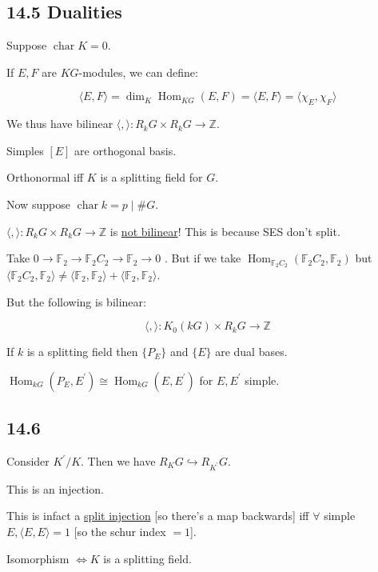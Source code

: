 \documentclass{article}
\theoremstyle{definition}
\begin{document}
\subsection*{14.5 Dualities}

Suppose \(\operatorname{char} K = 0\).

If \(E,F\) are \(KG\)-modules, we can define:

\[
    \langle E, F \rangle = \dim_K \operatorname{Hom}_{KG} (E,F) = \langle E,F \rangle = \langle \chi_E, \chi_F \rangle 
\]

We thus have bilinear \(\langle , \rangle : R_k G \times R_k G \to \mathbb{Z}\).

Simples \([E]\) are orthogonal basis.

Orthonormal iff \(K\) is a splitting field for \(G\).

Now suppose \(\operatorname{char} k = p \mid \#G\).

\(\langle , \rangle : R_k G \times R_k G \to \mathbb{Z}\) is \underline{not bilinear}! This is because SES don't split.

Take \(0 \to \mathbb{F}_2 \to \mathbb{F}_2 C_2 \to \mathbb{F}_2 \to 0\) . But if we take \(\operatorname{Hom}_{\mathbb{F}_2 C_2}(\mathbb{F}_2 C_2, \mathbb{F}_2)\) but \(\langle \mathbb{F}_2 C_2, \mathbb{F}_2 \rangle \neq \langle \mathbb{F}_2, \mathbb{F}_2 \rangle + \langle \mathbb{F}_2, \mathbb{F}_2 \rangle\).

But the following is bilinear:

\[
    \langle , \rangle : K_0(kG) \times R_k G \to \mathbb{Z}
\]

If \(k\) is a splitting field then \(\{ P_E \}\) and \(\{ E \}\) are dual bases.

\(\operatorname{Hom}_{kG}(P_E, E^{\prime}) \cong \operatorname{Hom}_{kG}(E,E^{\prime})\) for \(E,E^{\prime}\) simple.

\subsection*{14.6}

Consider \(K^{\prime} / K\). Then we have \(R_K G \hookrightarrow R_{K^{\prime}}G\).

This is an injection.

This is infact a \underline{split injection} [so there's a map backwards] iff \(\forall\) simple \(E, \langle E, E \rangle = 1\) [so the schur index \(=1\)].

Isomorphism \(\iff K\) is a splitting field.
\end{document}
